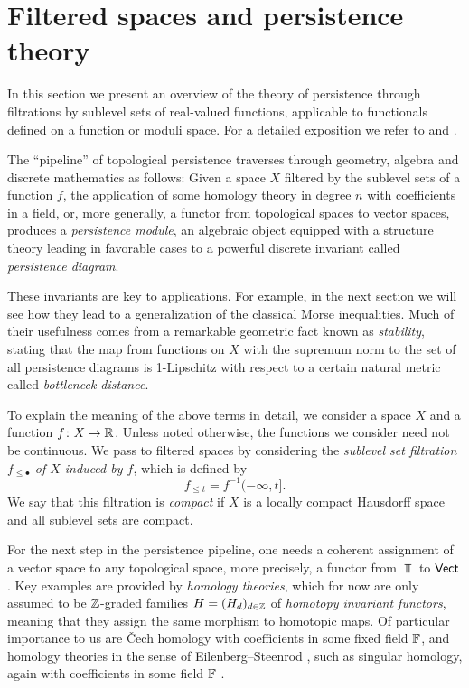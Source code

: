 
\section{Filtered spaces and persistence theory} \label{s:persistence}

In this section we present an overview of the theory of persistence through filtrations by sublevel sets of real-valued functions, applicable to functionals defined on a function or moduli space.
For a detailed exposition we refer to \cite{polterovich2020topological} and \cite{Chazal.2016a, MR3408277}.

The ``pipeline'' of topological persistence traverses through geometry, algebra and discrete mathematics as follows:
Given a space $X$ filtered by the sublevel sets of a function $f$, the application of some homology theory in degree $n$ with coefficients in a field,  or, more generally, a functor from topological spaces to vector spaces, produces a \textit{persistence module}, an algebraic object equipped with a structure theory leading in favorable cases to a powerful discrete invariant called \textit{persistence diagram}.

These invariants are key to applications.
For example, in the next section we will see how they lead to a generalization of the classical Morse inequalities.
Much of their usefulness comes from a remarkable geometric fact known as \emph{stability}, stating that the map from functions on $X$ with the supremum norm to the set of all persistence diagrams is 1-Lipschitz with respect to a certain natural metric called \emph{bottleneck distance}.

To explain the meaning of the above terms in detail, we consider a space $X$ and a function $f \colon X \to \mathbb{R}$.
Unless noted otherwise, the functions we consider need not be continuous.
We pass to filtered spaces by considering the \textit{sublevel set filtration $f_{\leq \bullet}$ of $X$ induced by $f$}, which is defined by
\begin{equation*}
f_{\leq t} = f^{-1}(-\infty, t].
\end{equation*}
We say that this filtration is \textit{compact} if $X$ is a locally compact Hausdorff space and all sublevel sets are compact.

For the next step in the persistence pipeline, one needs a coherent assignment of a vector space to any topological space, more precisely, a functor from $\Top$ to $\mathsf{Vect}$.
Key examples are provided by \emph{homology theories}, which for now are only assumed to be $\mathbb{Z}$-graded families $H = (H_d)_{d \in \mathbb{Z}}$ of \emph{homotopy invariant functors}, meaning that they assign the same morphism to homotopic maps.
Of particular importance to us are \v{C}ech homology \cite[Section IX--X]{MR0050886} with coefficients in some fixed field $\mathbb{F}$, and homology theories in the sense of Eilenberg--Steenrod \cite[Section I]{MR0050886}, such as singular homology, again with coefficients in some field $\mathbb{F}$ \cite{Eilenberg.1944}.

